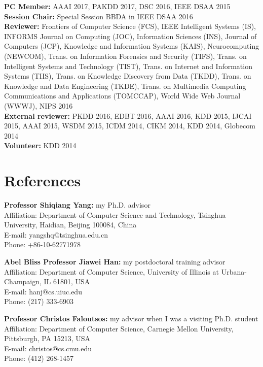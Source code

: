 \documentclass[margin, 10pt]{res}
\begin{document}
\begin{resume}
\textbf{PC Member:} AAAI 2017, PAKDD 2017, DSC 2016, IEEE DSAA 2015 \\
\textbf{Session Chair:} Special Session BBDA in IEEE DSAA 2016 \\
\textbf{Reviewer:}
Frontiers of Computer Science (FCS),
IEEE Intelligent Systems (IS),
INFORMS Journal on Computing (JOC),
Information Sciences (INS),
Journal of Computers (JCP),
Knowledge and Information Systems (KAIS),
Neurocomputing (NEWCOM),
Trans. on Information Forensics and Security (TIFS),
Trans. on Intelligent Systems and Technology (TIST),
Trans. on Internet and Information Systems (TIIS),
Trans. on Knowledge Discovery from Data (TKDD),
Trans. on Knowledge and Data Engineering (TKDE),
Trans. on Multimedia Computing Communications and Applications (TOMCCAP),
World Wide Web Journal (WWWJ), NIPS 2016 \\
\textbf{External reviewer:} PKDD 2016, EDBT 2016, AAAI 2016, KDD 2015, IJCAI 2015, AAAI 2015,
WSDM 2015, ICDM 2014, CIKM 2014, KDD 2014, Globecom 2014 \\
\textbf{Volunteer:} KDD 2014


\section{References}

\textbf{Professor Shiqiang Yang:} my Ph.D. advisor \\
{Affiliation}: {Department of Computer Science and Technology, Tsinghua University, Haidian, Beijing 100084, China} \\
{E-mail:} {yangshq@tsinghua.edu.cn} \\
{Phone:} {+86-10-62771978}

\textbf{Abel Bliss Professor Jiawei Han:} my postdoctoral training advisor \\
{Affiliation}: {Department of Computer Science, University of Illinois at Urbana-Champaign, IL 61801, USA} \\
{E-mail:} {hanj@cs.uiuc.edu} \\
{Phone:} {(217) 333-6903}

\textbf{Professor Christos Faloutsos:} my advisor when I was a visiting Ph.D. student \\
{Affiliation}: {Department of Computer Science, Carnegie Mellon University, Pittsburgh, PA 15213, USA} \\
{E-mail:} {christos@cs.cmu.edu} \\
{Phone:} {(412) 268-1457}


\end{resume}
\end{document}
